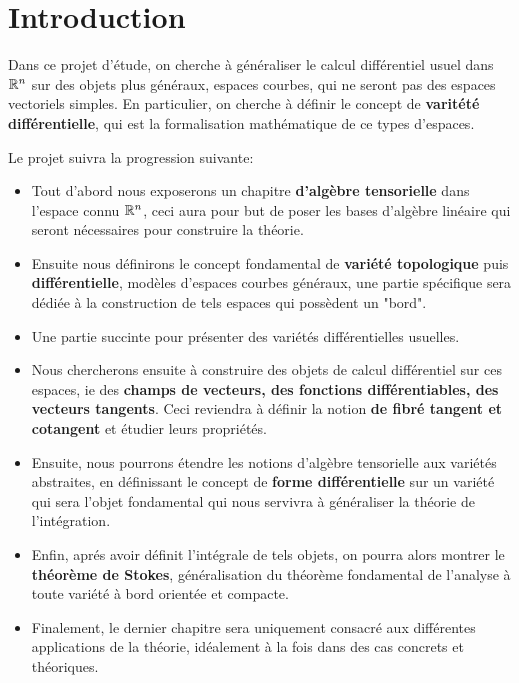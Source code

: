 \chapter{Introduction}
   Dans ce projet d'étude, on cherche à généraliser le calcul différentiel usuel dans \( \mathbb{R}^n \) sur des objets plus généraux, espaces courbes, qui ne seront pas des espaces vectoriels simples. En particulier, on cherche à définir le concept de \textbf{varitété différentielle}, qui est la formalisation mathématique de ce types d'espaces.\< 
   
   Le projet suivra la progression suivante:
   \begin{itemize}
      \item Tout d'abord nous exposerons un chapitre \textbf{d'algèbre tensorielle} dans l'espace connu \( \mathbb{R}^n \), ceci aura pour but de poser les bases d'algèbre linéaire qui seront nécessaires pour construire la théorie.
      \item Ensuite nous définirons le concept fondamental de \textbf{variété topologique} puis \textbf{différentielle}, modèles d'espaces courbes généraux, une partie spécifique sera dédiée à la construction de tels espaces qui possèdent un "bord".
      \item Une partie succinte pour présenter des variétés différentielles usuelles.
      \item Nous chercherons ensuite à construire des objets de calcul différentiel sur ces espaces, ie des \textbf{champs de vecteurs, des fonctions différentiables, des vecteurs tangents}. Ceci reviendra à définir la notion \textbf{de fibré tangent et cotangent} et étudier leurs propriétés.
      \item Ensuite, nous pourrons étendre les notions d'algèbre tensorielle aux variétés abstraites, en définissant le concept de \textbf{forme différentielle} sur un variété qui sera l'objet fondamental qui nous servivra à généraliser la théorie de l'intégration.
      \item Enfin, aprés avoir définit l'intégrale de tels objets, on pourra alors montrer le \textbf{théorème de Stokes}, généralisation du théorème fondamental de l'analyse à toute variété à bord orientée et compacte.
      \item Finalement, le dernier chapitre sera uniquement consacré aux différentes applications de la théorie, idéalement à la fois dans des cas concrets et théoriques.
   \end{itemize}